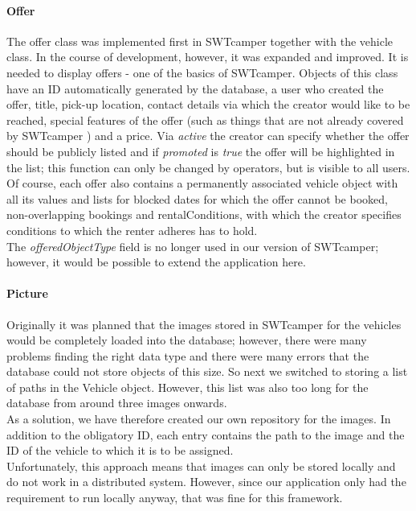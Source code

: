 \paragraph{Offer}
The offer class was implemented first in SWTcamper together with the vehicle class. In the course of development, however, it was expanded and improved. It is needed to display offers - one of the basics of SWTcamper. Objects of this class have an ID automatically generated by the database, a user who created the offer, title, pick-up location, contact details via which the creator would like to be reached, special features of the offer (such as things that are not already covered by SWTcamper ) and a price. Via \textit{active} the creator can specify whether the offer should be publicly listed and if \textit{promoted} is \textit{true} the offer will be highlighted in the list; this function can only be changed by operators, but is visible to all users. Of course, each offer also contains a permanently associated vehicle object with all its values and lists for blocked dates for which the offer cannot be booked, non-overlapping bookings and rentalConditions, with which the creator specifies conditions to which the renter adheres has to hold. \\
The \textit{offeredObjectType} field is no longer used in our version of SWTcamper; however, it would be possible to extend the application here.

\paragraph{Picture}
Originally it was planned that the images stored in SWTcamper for the vehicles would be completely loaded into the database; however, there were many problems finding the right data type and there were many errors that the database could not store objects of this size. So next we switched to storing a list of paths in the Vehicle object. However, this list was also too long for the database from around three images onwards. \\
As a solution, we have therefore created our own repository for the images. In addition to the obligatory ID, each entry contains the path to the image and the ID of the vehicle to which it is to be assigned. \\
Unfortunately, this approach means that images can only be stored locally and do not work in a distributed system. However, since our application only had the requirement to run locally anyway, that was fine for this framework.

